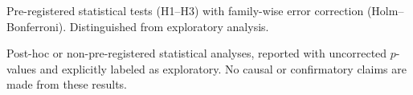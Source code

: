 \documentclass[11pt]{article}
\begin{document}
\begin{description}[style=nextline, leftmargin=3.5cm]
  \item[Confirmatory Analysis]
    Pre-registered statistical tests (H1--H3) with family-wise error
    correction (Holm--Bonferroni).  Distinguished from exploratory
    analysis.

  \item[Exploratory Analysis]
    Post-hoc or non-pre-registered statistical analyses, reported
    with uncorrected $p$-values and explicitly labeled as exploratory.
    No causal or confirmatory claims are made from these results.
\end{description}
\end{document}
